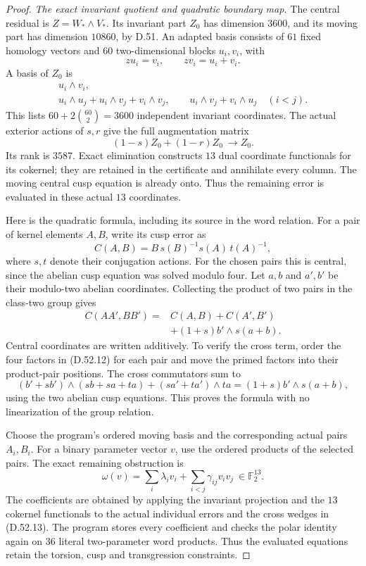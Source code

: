 \begin{proof}
\emph{The exact invariant quotient and quadratic boundary map.}
The central residual is
\(Z=W_*\wedge V_*\). Its invariant part
\(Z_0\) has dimension \(3600\), and its
moving part has dimension \(10860\), by D.51.
An adapted basis consists of \(61\) fixed
homology vectors and \(60\) two-dimensional
blocks \(u_i,v_i\), with
\[
                    zu_i=v_i,\qquad zv_i=u_i+v_i.
\]
A basis of \(Z_0\) is
\[
 \begin{gathered}
 u_i\wedge v_i,\\
 u_i\wedge u_j+u_i\wedge v_j+v_i\wedge v_j,\qquad
 u_i\wedge v_j+v_i\wedge u_j
                  \quad(i<j).
 \end{gathered}
 \tag{D.52.10}
\]
This lists \(60+2\binom{60}{2}=3600\)
independent invariant coordinates.
The actual exterior actions of \(s,r\)
give the full augmentation matrix
\[
       (1-s)Z_0+(1-r)Z_0\ \longrightarrow Z_0 .
 \tag{D.52.11}
\]
Its rank is \(3587\). Exact elimination
constructs \(13\) dual coordinate functionals
for its cokernel; they are retained in the
certificate and annihilate every column.
The moving central cusp equation is already
onto. Thus the remaining error is evaluated
in these actual \(13\) coordinates.

Here is the quadratic formula, including its
source in the word relation. For a pair of
kernel elements \(A,B\), write its cusp error as
\[
       C(A,B)=B\,s(B)^{-1}s(A)\,t(A)^{-1},
 \tag{D.52.12}
\]
where \(s,t\) denote their conjugation actions.
For the chosen pairs this is central, since
the abelian cusp equation was solved modulo
four. Let \(a,b\) and \(a',b'\) be their
modulo-two abelian coordinates. Collecting
the product of two pairs in the class-two
group gives
\[
 \begin{split}
 C(AA',BB')={}&C(A,B)+C(A',B')\\
             &+(1+s)b'\wedge s(a+b).
 \end{split}
 \tag{D.52.13}
\]
Central coordinates are written additively.
To verify the cross term, order the four
factors in (D.52.12) for each pair and move
the primed factors into their product-pair
positions. The cross commutators sum to
\[
   (b'+sb')\wedge(sb+sa+ta)
       +(sa'+ta')\wedge ta
       =(1+s)b'\wedge s(a+b),
\]
using the two abelian cusp equations.
This proves the formula with no linearization
of the group relation.

Choose the program's ordered moving basis
and the corresponding actual pairs \(A_i,B_i\).
For a binary parameter vector \(v\), use the
ordered products of the selected pairs.
The exact remaining obstruction is
\[
       \omega(v)=\sum_i\lambda_i v_i
                   +\sum_{i<j}\gamma_{ij}v_i v_j
                   \ \in\mathbb F_2^{13}.
 \tag{D.52.14}
\]
The coefficients are obtained by applying
the invariant projection and the \(13\)
cokernel functionals to the actual individual
errors and the cross wedges in (D.52.13).
The program stores every coefficient and
checks the polar identity again on \(36\)
literal two-parameter word products.
Thus the evaluated equations retain the
torsion, cusp and transgression constraints.


\end{proof}
